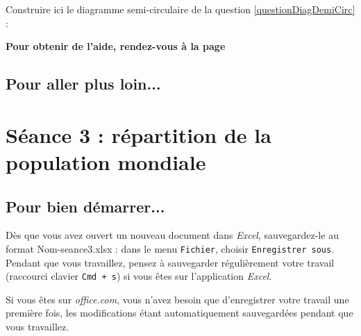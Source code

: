 
Construire ici le diagramme semi-circulaire de la question \ref{questionDiagDemiCirc}   :


\textbf{Pour obtenir de l'aide, rendez-vous à la page \pageref{Tableur5eOutils}}



\subsection{Pour aller plus loin...}

\vfill


\phantom{rien} 




%
%
%
%

\newpage


\section{Séance 3 : répartition de la population mondiale}\label{ficheTableur5e3}

\subsection{Pour bien démarrer...}

Dès que vous avez ouvert un nouveau document dans \emph{Excel}, sauvegardez-le au format Nom-seance3.xlsx : dans le menu \texttt{Fichier}, choisir \texttt{Enregistrer sous}. Pendant que vous travaillez, pensez à sauvegarder régulièrement votre travail (raccourci clavier \texttt{Cmd + s}) si vous êtes sur l'application \emph{Excel}.


Si vous êtes sur \emph{office.com}, vous n'avez besoin que d'enregistrer votre travail une première fois, les modifications étant automatiquement sauvegardées pendant que vous travaillez.

